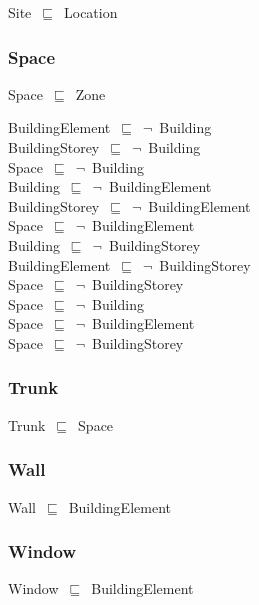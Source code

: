 \documentclass{article}
\begin{document}
Site~\ensuremath{\sqsubseteq}~Location~

\subsubsection*{Space}

Space~\ensuremath{\sqsubseteq}~Zone~

BuildingElement~\ensuremath{\sqsubseteq}~\ensuremath{\lnot}~Building\\
BuildingStorey~\ensuremath{\sqsubseteq}~\ensuremath{\lnot}~Building\\
Space~\ensuremath{\sqsubseteq}~\ensuremath{\lnot}~Building\\
Building~\ensuremath{\sqsubseteq}~\ensuremath{\lnot}~BuildingElement\\
BuildingStorey~\ensuremath{\sqsubseteq}~\ensuremath{\lnot}~BuildingElement\\
Space~\ensuremath{\sqsubseteq}~\ensuremath{\lnot}~BuildingElement\\
Building~\ensuremath{\sqsubseteq}~\ensuremath{\lnot}~BuildingStorey\\
BuildingElement~\ensuremath{\sqsubseteq}~\ensuremath{\lnot}~BuildingStorey\\
Space~\ensuremath{\sqsubseteq}~\ensuremath{\lnot}~BuildingStorey\\
Space~\ensuremath{\sqsubseteq}~\ensuremath{\lnot}~Building\\
Space~\ensuremath{\sqsubseteq}~\ensuremath{\lnot}~BuildingElement\\
Space~\ensuremath{\sqsubseteq}~\ensuremath{\lnot}~BuildingStorey\\


\subsubsection*{Trunk}

Trunk~\ensuremath{\sqsubseteq}~Space~

\subsubsection*{Wall}

Wall~\ensuremath{\sqsubseteq}~BuildingElement~

\subsubsection*{Window}

Window~\ensuremath{\sqsubseteq}~BuildingElement~
\end{document}
